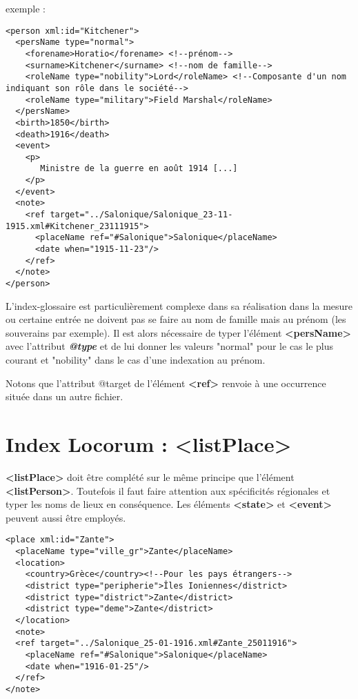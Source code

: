 \documentclass[18pt,a4paper,oneside]{book} %
\begin{document}
exemple :
\begin{lstlisting}
<person xml:id="Kitchener">
  <persName type="normal">
    <forename>Horatio</forename> <!--prénom-->
    <surname>Kitchener</surname> <!--nom de famille-->
    <roleName type="nobility">Lord</roleName> <!--Composante d'un nom indiquant son rôle dans le société-->
    <roleName type="military">Field Marshal</roleName>                     
  </persName>
  <birth>1850</birth>
  <death>1916</death>
  <event>
    <p>
       Ministre de la guerre en août 1914 [...]
    </p>
  </event>
  <note>
    <ref target="../Salonique/Salonique_23-11-1915.xml#Kitchener_23111915">
      <placeName ref="#Salonique">Salonique</placeName>
      <date when="1915-11-23"/>
    </ref>
  </note>
</person>
\end{lstlisting}
\bigskip 

L'index-glossaire est particulièrement complexe dans sa réalisation dans la mesure ou certaine entrée ne doivent pas se faire au nom de famille mais au prénom (les souverains par exemple). Il est alors nécessaire de typer l'élément \textbf{<persName>} avec l'attribut \textit{\textbf{@type}} et de lui donner les valeurs "normal" pour le cas le plus courant et "nobility" dans le cas d'une indexation au prénom.

Notons que l'attribut @target de l'élément \textbf{<ref>} renvoie à une occurrence située dans un autre fichier. %

\section{Index Locorum : <listPlace>}

\textbf{<listPlace>} doit être complété sur le même principe que l'élément \textbf{<listPerson>}. Toutefois il faut faire attention aux spécificités régionales et typer les noms de lieux en conséquence. Les éléments \textbf{<state>} et \textbf{<event>} peuvent aussi être employés.
\bigskip 

\begin{lstlisting}
<place xml:id="Zante">               
  <placeName type="ville_gr">Zante</placeName>
  <location>
    <country>Grèce</country><!--Pour les pays étrangers-->
    <district type="peripherie">Îles Ioniennes</district>
    <district type="district">Zante</district>
    <district type="deme">Zante</district>
  </location>                  
  <note>                  
  <ref target="../Salonique_25-01-1916.xml#Zante_25011916">
    <placeName ref="#Salonique">Salonique</placeName>
    <date when="1916-01-25"/>
  </ref>                     
</note>                  
\end{lstlisting}
\end{document}
